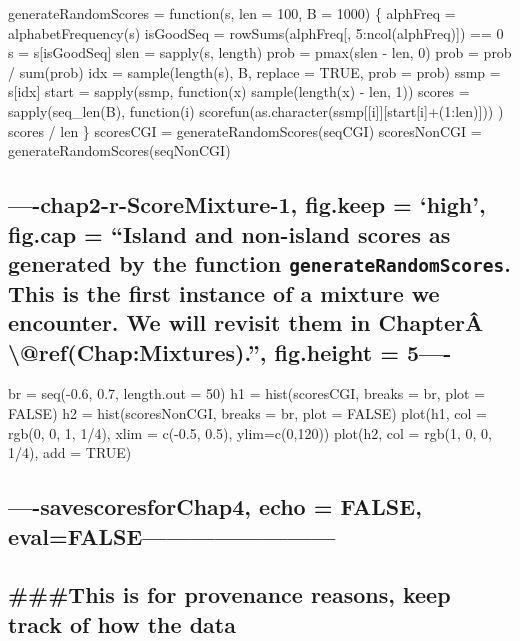 \documentclass[]{article}
\begin{document}
generateRandomScores = function(s, len = 100, B = 1000) \{ alphFreq =
alphabetFrequency(s) isGoodSeq = rowSums(alphFreq{[},
5:ncol(alphFreq){]}) == 0 s = s{[}isGoodSeq{]} slen = sapply(s, length)
prob = pmax(slen - len, 0) prob = prob / sum(prob) idx =
sample(length(s), B, replace = TRUE, prob = prob) ssmp = s{[}idx{]}
start = sapply(ssmp, function(x) sample(length(x) - len, 1)) scores =
sapply(seq\_len(B), function(i)
scorefun(as.character(ssmp{[}{[}i{]}{]}{[}start{[}i{]}+(1:len){]})) )
scores / len \} scoresCGI = generateRandomScores(seqCGI) scoresNonCGI =
generateRandomScores(seqNonCGI)

\subsection{\texorpdfstring{----chap2-r-ScoreMixture-1, fig.keep =
`high', fig.cap = ``Island and non-island scores as generated by the
function \texttt{generateRandomScores}. This is the first instance of a
\textbf{mixture} we encounter. We will revisit them in ChapterÂ
\textbackslash{}@ref(Chap:Mixtures).'', fig.height =
5----}{----chap2-r-ScoreMixture-1, fig.keep = high, fig.cap = Island and non-island scores as generated by the function generateRandomScores. This is the first instance of a mixture we encounter. We will revisit them in ChapterÂ \textbackslash{}@ref(Chap:Mixtures)., fig.height = 5----}}\label{chap2-r-scoremixture-1-fig.keep-high-fig.cap-island-and-non-island-scores-as-generated-by-the-function-generaterandomscores.-this-is-the-first-instance-of-a-mixture-we-encounter.-we-will-revisit-them-in-chapteruxe2-refchapmixtures.-fig.height-5-}

br = seq(-0.6, 0.7, length.out = 50) h1 = hist(scoresCGI, breaks = br,
plot = FALSE) h2 = hist(scoresNonCGI, breaks = br, plot = FALSE)
plot(h1, col = rgb(0, 0, 1, 1/4), xlim = c(-0.5, 0.5), ylim=c(0,120))
plot(h2, col = rgb(1, 0, 0, 1/4), add = TRUE)

\subsection{----savescoresforChap4, echo = FALSE,
eval=FALSE------------------------}\label{savescoresforchap4-echo-false-evalfalse}

\subsection{\#\#\#This is for provenance reasons, keep track of how the
data}\label{this-is-for-provenance-reasons-keep-track-of-how-the-data}
\end{document}
